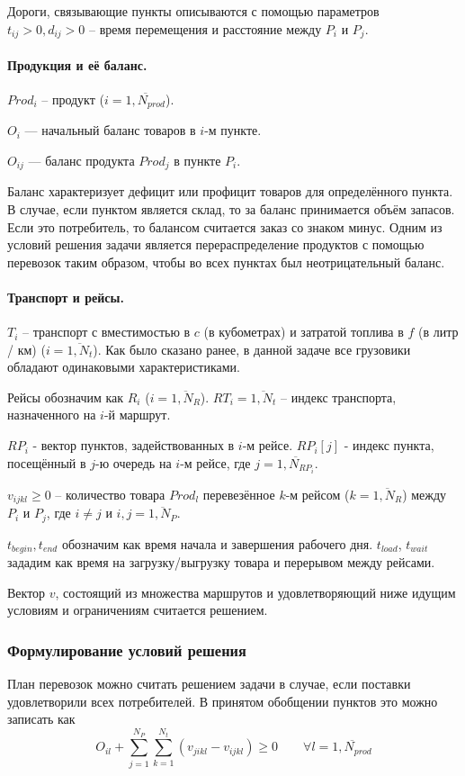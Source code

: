 	Дороги, связывающие пункты описываются с помощью параметров $t_{ij} > 0, d_{ij} > 0$ -- время перемещения и расстояние между $P_i$ и $P_j$.
	
	\paragraph*{Продукция и её баланс.}
	$Prod_i$ -- продукт ($i = \overline{1, N_{prod}}$).
	
	$O_i$ --- начальный баланс товаров в $i$-м пункте. 
	 
	$O_{ij}$ --- баланс продукта $Prod_j$ в пункте $P_i$.  
	
	Баланс характеризует дефицит или профицит товаров для определённого пункта. В случае, если пунктом является склад, то за баланс принимается объём запасов. Если это потребитель, то балансом считается заказ со знаком минус. Одним из условий решения задачи является перераспределение продуктов с помощью перевозок таким образом, чтобы во всех пунктах был неотрицательный баланс. 
	
	\paragraph*{Транспорт и рейсы.}
	$T_i$ -- транспорт с вместимостью в $c$ (в кубометрах) и затратой топлива в $f$ (в литр / км) ($i = \overline{1, N_t}$). Как было сказано ранее, в данной задаче все грузовики обладают одинаковыми характеристиками.
	
	Рейсы обозначим как $R_i$ ($i = \overline{1, N_R}$). $RT_i = \overline{1, N_t}$ -- индекс транспорта, назначенного на $i$-й маршрут.
	
	$RP_i$ - вектор пунктов, задействованных в $i$-м рейсе. $RP_i[j]$ - индекс пункта, посещённый в $j$-ю очередь на $i$-м рейсе, где $j = \overline{1, N_{RP_i}}$.
	
	$v_{ijkl} \ge 0$ -- количество товара $Prod_l$ перевезённое $k$-м рейсом ($k = \overline{1, N_R}$) между $P_i$ и $P_j$, где $i \ne j$ и $i, j = \overline{1, N_P}$. 
	
	$t_{begin}, t_{end}$ обозначим как время начала и завершения рабочего дня. $t_{load}$, $t_{wait}$ зададим как время на загрузку/выгрузку товара и перерывом между рейсами.
	
	Вектор $v$, состоящий из множества маршрутов и удовлетворяющий ниже идущим условиям и ограничениям считается решением.
	
	\subsubsection{Формулирование условий решения}    
	План перевозок можно считать решением задачи в случае, если поставки удовлетворили всех потребителей. В принятом обобщении пунктов это можно записать как
	\begin{equation}
		O_{il} + \sum_{j=1}^{N_P} \sum_{k=1}^{N_t} (v_{jikl} - v_{ijkl}) \ge 0 \qquad  \forall l = \overline{1, N_{prod}}
	\end{equation}
	
